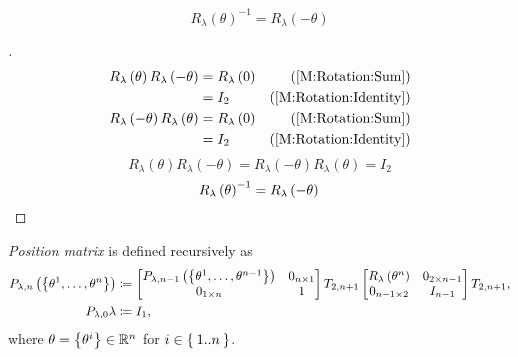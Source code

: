 \documentclass[../main.tex]{subfiles}
\begin{document}
\begin{corollary}\label{M:Rotation:Inverse}
\begin{equation*}
R_\lambda\left(\theta\right)^{-1}=R_\lambda\left(-\theta\right)
\end{equation*}
\end{corollary}
\begin{proof}[]
\begin{align*}
R_\lambda\left(\theta\right)
R_\lambda\left(-\theta\right)
&=R_\lambda\left(0\right)&\text{(\cref{M:Rotation:Sum})}\\
&=I_2&\text{(\cref{M:Rotation:Identity})}\\
R_\lambda\left(-\theta\right)
R_\lambda\left(\theta\right)
&=R_\lambda\left(0\right)&\text{(\cref{M:Rotation:Sum})}\\
&=I_2&\text{(\cref{M:Rotation:Identity})}
\end{align*}
\begin{equation*}
R_\lambda\left(\theta\right)R_\lambda\left(-\theta\right)
=R_\lambda\left(-\theta\right)R_\lambda\left(\theta\right)
=I_2
\end{equation*}
\begin{equation*}
{R_\lambda\left(\theta\right)}^{-1}
=
R_\lambda\left(-\theta\right)
\qedhere
\end{equation*}
\end{proof}
\begin{definition}\label{M:Position}
\textit{Position matrix} is defined recursively as
\begin{align*}
P_{\lambda,n}\left(\left\{\tensor{\theta}{^1},\dots,\tensor{\theta}{^n}\right\}\right)
&\coloneqq
\begin{bmatrix}
P_{\lambda,n-1}\left(\left\{\tensor{\theta}{^1},\dots,\tensor{\theta}{^{n-1}}\right\}\right)&0_{n\times 1}\\
0_{1\times n}&1\\
\end{bmatrix}
T_{2,n+1}
\begin{bmatrix}
R_\lambda\left(\tensor{\theta}{^n}\right)&0_{{2}\times{n-1}}\\
0_{{n-1}\times{2}}&{I}_{n-1}\\
\end{bmatrix}
T_{2,n+1}\text{,}\\
P_{\lambda,0}
\lambda&\coloneqq I_1\text{,}
\end{align*}
where $\theta=\left\{\tensor{\theta}{^i}\right\}\in\R^n$ for $i\in\Set{1..n}$.
\end{definition}
\end{document}
